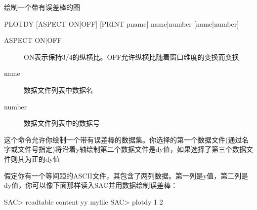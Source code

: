 \label{cmd:plotdy}

绘制一个带有误差棒的图

\begin{SACSTX}
PLOTDY [ASPECT ON|OFF] [PRINT pname] name|number [name|number]
\end{SACSTX}

\begin{description}
\item [ASPECT ON|OFF] ON表示保持3/4的纵横比。OFF允许纵横比随着窗口维度的变换而变换
\item [name] 数据文件列表中数据名
\item [number] 数据文件列表中的数据号
\end{description}

这个命令允许你绘制一个带有误差棒的数据集。你选择的第一个数据文件(通过名字或文件号指定)将沿着y轴绘制第二个数据文件是dy值，如果选择了第三个数据文件则其为正的dy值

假定你有一个等间距的ASCII文件，其包含了两列数据。第一列是y值，第二列是
dy值，你可以像下面那样读入SAC并用数据绘制误差棒：
\begin{SACCode}
SAC> readtable content yy myfile
SAC> plotdy 1 2
\end{SACCode}
